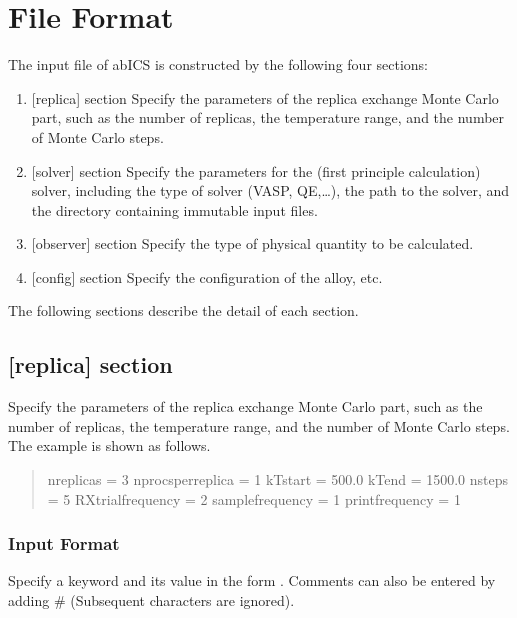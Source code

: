 \documentclass[letterpaper,10pt,english]{sphinxmanual}
\begin{document}
\chapter{File Format}
\label{\detokenize{file_specification/index:file-format}}\label{\detokenize{file_specification/index::doc}}
The input file of abICS is constructed by the following four sections:
\begin{enumerate}
\item {} 
{[}replica{]} section
Specify the parameters of the replica exchange Monte Carlo part, such as the number of replicas, the temperature range, and the number of Monte Carlo steps.

\item {} 
{[}solver{]} section
Specify the parameters for the (first principle calculation) solver, including the type of solver (VASP, QE,…), the path to the solver, and the directory containing immutable input files.

\item {} 
{[}observer{]} section
Specify the type of physical quantity to be calculated.

\item {} 
{[}config{]} section
Specify the configuration of the alloy, etc.

\end{enumerate}

The following sections describe the detail of each section.


\section{{[}replica{]} section}
\label{\detokenize{file_specification/parameter_replica::doc}}\label{\detokenize{file_specification/parameter_replica:replica-section}}
Specify the parameters of the replica exchange Monte Carlo part, such as the number of replicas, the temperature range, and the number of Monte Carlo steps.
The example is shown as follows.
\begin{quote}

\begin{sphinxVerbatim}[commandchars=\\\{\}]
[replica]
nreplicas = 3
nprocs\PYGZus{}per\PYGZus{}replica = 1
kTstart = 500.0
kTend = 1500.0
nsteps = 5
RXtrial\PYGZus{}frequency = 2
sample\PYGZus{}frequency = 1
print\PYGZus{}frequency = 1
\end{sphinxVerbatim}
\end{quote}


\subsection{Input Format}
\label{\detokenize{file_specification/parameter_replica:input-format}}
Specify a keyword and its value in the form .
Comments can also be entered by adding \# (Subsequent characters are ignored).
\end{document}
